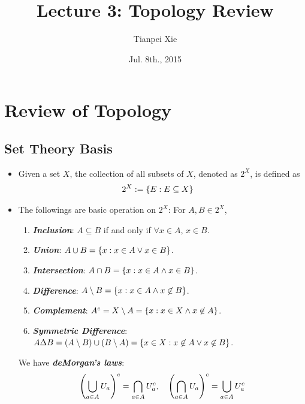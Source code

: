 \documentclass[11pt]{article}
\begin{document}
\title{Lecture 3: Topology Review}
\author{ Tianpei Xie}
\date{ Jul. 8th., 2015 }
\maketitle
\tableofcontents
\newpage
\section{Review of Topology}
\subsection{Set Theory Basis}
\begin{itemize}
\item \begin{definition}
Given a set $X$, the collection of all subsets of $X$, denoted as $2^X$, is defined as
\begin{align*}
2^X &:= \left\{E: E \subseteq X\right\}
\end{align*}
\end{definition}

\item \begin{remark}
The followings are basic operation on $2^X$: For $A, B \in 2^X$,
\begin{enumerate}
\item \emph{\textbf{Inclusion}}:   $A \subseteq B$ if and only if $\forall x \in A$, $x \in B$.
\item \emph{\textbf{Union}}:  $A \cup B = \left\{x: x \in A \lor x \in B\right\}$.
\item \emph{\textbf{Intersection}}:  $A \cap B = \left\{x: x \in A \land x \in B\right\}$.
\item \emph{\textbf{Difference}}:  $A \setminus B = \left\{x: x \in A \land x \not\in B\right\}$.
\item \emph{\textbf{Complement}}: $A^{c} = X \setminus A = \left\{x: x \in X \land x \not\in A\right\}$.
\item \emph{\textbf{Symmetric Difference}}:  $A \Delta B = (A \setminus B) \cup (B \setminus A) = \left\{x \in X: x \not\in A \lor x \not\in B\right\}$.
\end{enumerate}
We have \emph{\textbf{deMorgan's laws}}:
\begin{align*}
\left(\bigcup_{a \in A}U_a\right)^c = \bigcap_{a \in A}U_a^c, \quad \left(\bigcap_{a \in A}U_a\right)^c = \bigcup_{a \in A}U_a^c
\end{align*}
\end{remark}


\end{itemize}
\end{document}

